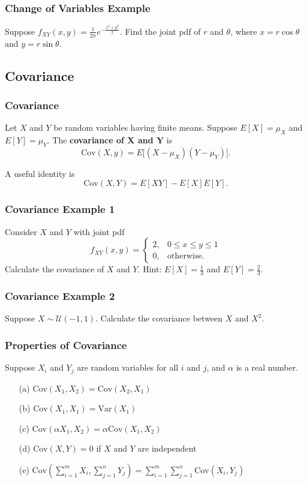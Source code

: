 \documentclass{beamer}
\begin{document}
\begin{frame}[t]
\frametitle{Change of Variables Example}
\begin{Example}
Suppose $f_{XY}(x, y) = \frac{1}{2\pi} e^{-\frac{x^2 + y^2}{2}}$. Find the joint pdf of $r$ and $\theta$, where $x = r\cos\theta$ and $y=r\sin\theta$.
\end{Example}
\end{frame}

\subsection{Covariance}
\begin{frame}
\frametitle{Covariance}
\begin{Definition}
Let $X$ and $Y$ be random variables having finite means. Suppose $E[X] = \mu_X$ and $E[Y] = \mu_Y$. The {\bf covariance of $\boldsymbol X$ and $\boldsymbol Y$} is
$$
\text{Cov}(X, y) = E\Big[(X - \mu_X)(Y - \mu_Y)\Big].
$$
\end{Definition}
A useful identity is
$$
\text{Cov}(X, Y) = E[XY] - E[X]E[Y].
$$
\end{frame}

\begin{frame}[t]
\frametitle{Covariance Example 1}
\tiny
\begin{Example}
Consider $X$ and $Y$ with joint pdf
$$
f_{XY}(x, y) = \begin{cases} 2, &	0\leq x \leq y\leq 1\\ 0,	&	\text{otherwise.}\end{cases}
$$
Calculate the covariance of $X$ and $Y$. Hint: $E[X] = \frac{1}{3}$ and  $E[Y] =  \frac{2}{3}.$
\end{Example}

\end{frame}

\begin{frame}[t]
\frametitle{Covariance Example 2}
\begin{Example}
Suppose $X\sim{\mathcal{U}(-1, 1)}$. Calculate the covariance between $X$ and $X^2$.
\end{Example}

\end{frame}


\begin{frame}
\frametitle{Properties of Covariance}
Suppose $X_i$ and $Y_j$ are random variables for all $i$ and $j$, and $\alpha$ is a real number.
\begin{enumerate}
\item[(a)] $\text{Cov}(X_1, X_2) = \text{Cov}(X_2, X_1)$
\item[(b)] $\text{Cov}(X_1, X_1) = \text{Var}(X_1)$
\item[(c)] $\text{Cov}(\alpha X_1, X_2) = \alpha \text{Cov}(X_1, X_2)$
\item[(d)] $\text{Cov}(X,Y) = 0$ if $X$ and $Y$ are independent 
\item[(e)] $\displaystyle \text{Cov}\left(\sum_{i = 1}^m X_i, \sum_{j = 1}^n Y_j\right) = \sum_{i = 1}^m\sum_{j = 1}^n \text{Cov}(X_i, Y_j)$
\end{enumerate}

\end{frame}
\end{document}
